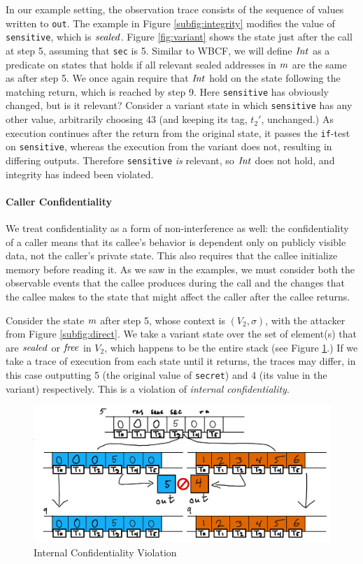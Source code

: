 \documentclass[10pt,conference]{ieeetran}%
\theoremstyle{definition}
\begin{document}
In our example setting, the observation trace consists of the sequence of values written to {\tt out}.
The example in Figure \ref{subfig:integrity} modifies the value of {\tt sensitive},
which is \(\mathit{sealed}\). Figure \ref{fig:variant} shows the state just after the call at step 5,
assuming that {\tt sec} is 5. Similar to WBCF, we will define
\(\mathit{Int}\) as a predicate on states that holds if
all relevant sealed addresses in \(m\) are the same as after step 5.
We once again require that \(\mathit{Int}\) hold on the state following the matching return, 
which is reached by step 9. Here {\tt sensitive} has obviously changed, but is it relevant?
Consider a variant state in which {\tt sensitive} has any other value, arbitrarily
choosing 43 (and keeping its tag, \(t_2'\), unchanged.) As execution continues after the return
from the original state, it passes the {\tt if}-test on {\tt sensitive}, whereas the execution
from the variant does not, resulting in differing outputs. Therefore {\tt sensitive} \emph{is} relevant,
so \(\mathit{Int}\) does not hold, and integrity has indeed been violated.

\paragraph*{Caller Confidentiality}

We treat confidentiality as a form of non-interference as well: the confidentiality of a caller
means that its callee's behavior is dependent only on publicly visible data,
not the caller's private state. This also requires that the callee initialize
memory before reading it.
As we saw in the examples, we must consider both the observable events
that the callee produces during the call and the changes that the callee makes to the state that might
affect the caller after the callee returns.

Consider the state \(m\) after step 5, whose context is \((V_2,\sigma)\), with the attacker from
Figure \ref{subfig:direct}. We take a variant state over the set of element(s) that are
\(\mathit{sealed}\) or \(\mathit{free}\) in \(V_2\), which happens to be the entire stack (see
Figure \ref{fig:variant2}.) If we take a trace of execution from each state until it returns,
the traces may differ, in this case outputting 5 (the original value of {\tt secret}) and
4 (its value in the variant) respectively. This is a violation of
{\it internal confidentiality}.

\begin{figure}
  \includegraphics[width=\columnwidth]{variants2.png}
  \caption{Internal Confidentiality Violation}
  \label{fig:variant2}
\end{figure}
\end{document}
